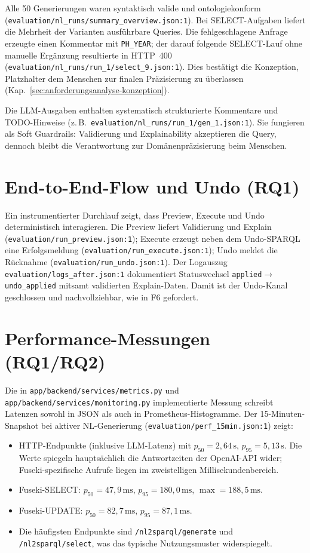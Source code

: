 Alle 50 Generierungen waren syntaktisch valide und ontologiekonform (\texttt{evaluation/nl\_runs/summary\_overview.json:1}). Bei SELECT-Aufgaben liefert die Mehrheit der Varianten ausführbare Queries. Die fehlgeschlagene Anfrage erzeugte einen Kommentar mit \texttt{PH\_YEAR}; der darauf folgende SELECT-Lauf ohne manuelle Ergänzung resultierte in HTTP~400 (\texttt{evaluation/nl\_runs/run\_1/select\_9.json:1}). Dies bestätigt die Konzeption, Platzhalter dem Menschen zur finalen Präzisierung zu überlassen (Kap.~\ref{sec:anforderungsanalyse-konzeption}).

Die LLM-Ausgaben enthalten systematisch strukturierte Kommentare und TODO-Hinweise (z.\,B.\ \texttt{evaluation/nl\_runs/run\_1/gen\_1.json:1}). Sie fungieren als Soft Guardrails: Validierung und Explainability akzeptieren die Query, dennoch bleibt die Verantwortung zur Domänenpräzisierung beim Menschen.

\section{End-to-End-Flow und Undo (RQ1)}

Ein instrumentierter Durchlauf zeigt, dass Preview, Execute und Undo deterministisch interagieren. Die Preview liefert Validierung und Explain (\texttt{evaluation/run\_preview.json:1}); Execute erzeugt neben dem Undo-SPARQL eine Erfolgsmeldung (\texttt{evaluation/run\_execute.json:1}); Undo meldet die Rücknahme (\texttt{evaluation/run\_undo.json:1}). Der Logauszug \texttt{evaluation/logs\_after.json:1} dokumentiert Statuswechsel \texttt{applied}$\rightarrow$\texttt{undo\_applied} mitsamt validierten Explain-Daten. Damit ist der Undo-Kanal geschlossen und nachvollziehbar, wie in F6 gefordert.

\section{Performance-Messungen (RQ1/RQ2)}

Die in \texttt{app/backend/services/metrics.py} und \texttt{app/backend/services/monitoring.py} implementierte Messung schreibt Latenzen sowohl in JSON als auch in Prometheus-Histogramme. Der 15-Minuten-Snapshot bei aktiver NL-Generierung (\texttt{evaluation/perf\_15min.json:1}) zeigt:

\begin{itemize}
  \item HTTP-Endpunkte (inklusive LLM-Latenz) mit $p_{50} = 2{,}64\,\mathrm{s}$, $p_{95} = 5{,}13\,\mathrm{s}$. Die Werte spiegeln hauptsächlich die Antwortzeiten der OpenAI-API wider; Fuseki-spezifische Aufrufe liegen im zweistelligen Millisekundenbereich.
  \item Fuseki-SELECT: $p_{50} = 47{,}9\,\mathrm{ms}$, $p_{95} = 180{,}0\,\mathrm{ms}$, $ \max = 188{,}5\,\mathrm{ms}$.
  \item Fuseki-UPDATE: $p_{50} = 82{,}7\,\mathrm{ms}$, $p_{95} = 87{,}1\,\mathrm{ms}$.
  \item Die häufigsten Endpunkte sind \texttt{/nl2sparql/generate} und \texttt{/nl2sparql/select}, was das typische Nutzungsmuster widerspiegelt.
\end{itemize}

